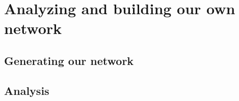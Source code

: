 \section{Analyzing and building our own network}

\subsection{Generating our network}

\subsection{Analysis}

